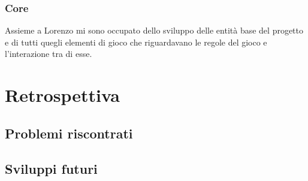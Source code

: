 \documentclass[a4paper,10pt]{article}
\begin{document}
    \subsubsection{Core}
    Assieme a Lorenzo mi sono occupato dello sviluppo delle entità base del progetto e di tutti quegli elementi di gioco che riguardavano le regole del gioco e l'interazione tra di esse.

    \newpage


    \section{Retrospettiva}\label{sec:retrospettiva}

    \subsection{Problemi riscontrati}

    \subsection{Sviluppi futuri}

    \newpage
\end{document}

